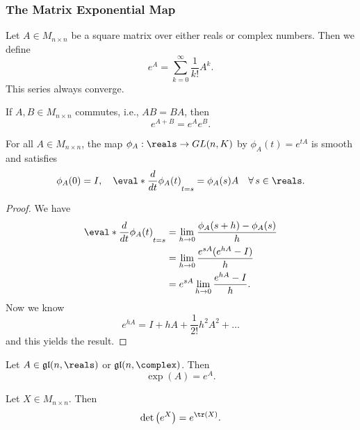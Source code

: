 \documentclass[../main.tex]{subfiles}
\begin{document}
\subsubsection{The Matrix Exponential Map}
\begin{definition}
\label{def:The-Matrix-Exponential}
    Let \(A \in M_{n \times n}\) be a square matrix over either reals
    or complex numbers. Then we define
    \[
    e^{A} = \sum_{k=0}^{\infty} \frac{1}{k!}A^k.
    \]
    This series always converge.
\end{definition}
\begin{theorem}
\label{thm:Exponential-of-Sum-for-Commuting-Matrices}
    If \(A, B \in M_{n \times n}\) commutes, i.e., \(AB = BA\), then
    \[
    e^{A+B} = e^{A}e^{B}.
    \]
\end{theorem}
\begin{theorem}
\label{thm:Properties-of-Matrix-Exponential}
    For all \(A \in M_{n\times n}\), the map \(\phi_A : \reals \to
    \GL{n}{K}\) by \(\phi_A(t) = e^{tA}\) is smooth and satisfies
    \[
    \phi_A(0) = I, \quad \eval*{\frac{d}{dt}\phi_A(t)}_{t=s} = \phi_A(s)A
    \quad \forall\, s \in \reals.
    \]
\end{theorem}
\begin{proof}
    We have
    \[
    \begin{aligned}
        \eval*{\frac{d}{dt}\phi_A(t)}_{t=s} &= \lim_{h \to 0}
        \frac{\phi_A(s+h)-\phi_A(s)}{h} \\
        &= \lim_{h \to 0} \frac{e^{sA}(e^{hA} - I)}{h} \\
        &= e^{sA} \lim_{h \to 0} \frac{e^{hA} - I}{h}.
    \end{aligned}
    \]
    Now we know
    \[
    e^{hA} = I + hA + \frac{1}{2!}h^2A^2 + \dots
    \]
    and this yields the result.
\end{proof}
\begin{theorem}
\label{thm:Exponential-Map-of-Linear-Group-is-Matrix-Exponential}
    Let \(A \in \gl{n}{\reals}\) or \(\gl{n}{\complex}\). Then
    \[
    \exp(A) = e^{A}.
    \]
\end{theorem}
\begin{theorem}
\label{thm:Determinant-of-Matrix-Exponential}
    Let \(X \in M_{n \times n}\). Then
    \[
    \det \left( e^{X} \right) = e^{\tr(X)}.
    \]
\end{theorem}
\end{document}
